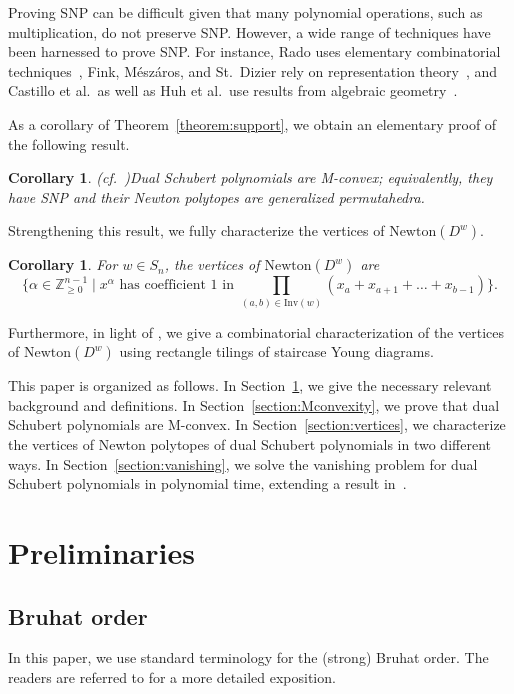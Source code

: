 \documentclass[11pt]{article}
\newtheorem{coro}[theo]{Corollary}
\theoremstyle{definition}
\providecommand{\cf}{cf.\ }
\numberwithin{equation}{section}
\newcommand{\Inv}{\mathrm{Inv}}
\newcommand{\Newton}{\mathrm{Newton}}
\newcommand{\ZZ}{\mathbb{Z}}
\begin{document}
Proving SNP can be difficult given that many polynomial operations, such as multiplication, do not preserve SNP. However, a wide range of techniques have been harnessed to prove SNP. For instance, Rado uses elementary combinatorial techniques~\cite{Rado}, Fink, M\'esz\'aros, and St.\ Dizier rely on representation theory~\cite{FMD}, and Castillo et al.\ as well as Huh et al.\ use results from algebraic geometry~\cite{DoubleSchSNP,HuhMeszaroLorSchur}. 

As a corollary of Theorem~\ref{theorem:support}, we obtain an elementary proof of the following result.

\begin{coro}\textup{(}\cf \cite[Proposition~18]{HuhMeszaroLorSchur}\textup{)}\label{thm:M-conv}
Dual Schubert polynomials are \emph{M-convex}; equivalently, they have SNP and their Newton polytopes are generalized permutahedra.
\end{coro}

Strengthening this result, we fully characterize the vertices of $\Newton(D^w)$.

\begin{coro}\label{thm:DSPNPVert}
    For $w\in S_n$, the vertices of $\Newton(D^w)$ are
    \[\{\alpha\in\ZZ_{\ge 0}^{n-1} \mid x^{\alpha}\text{ has coefficient }1\text{ in }\prod_{(a,b) \in \Inv(w)} (x_a+x_{a+1}+\dots +x_{b-1})\}.\]
\end{coro}

Furthermore, in light of \cite[Corollary~8.2]{postnikovpermutohedra}, we give a combinatorial characterization of the vertices of $\Newton(D^w)$ using rectangle tilings of staircase Young diagrams.

This paper is organized as follows. In Section~\ref{section:preliminaries}, we give the necessary relevant background and definitions. In Section~\ref{section:Mconvexity}, we prove that dual Schubert polynomials are M-convex. In Section~\ref{section:vertices}, we characterize the vertices of Newton polytopes of dual Schubert polynomials in two different ways. In Section~\ref{section:vanishing}, we solve the vanishing problem for dual Schubert polynomials in polynomial time, extending a result in~\cite{ARY}.

\section{Preliminaries}\label{section:preliminaries}
\subsection{Bruhat order}
In this paper, we use standard terminology for the (strong) Bruhat order. The readers are referred to \cite[Chapter~2]{BjornerBrenti} for a more detailed exposition.
\end{document}
